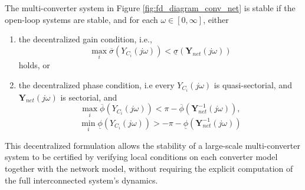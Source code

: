 \begin{thm}
    The multi-converter system in Figure \ref{fig:fd_diagram_conv_net} is stable if the open-loop systems are stable, and for each $\omega \in [0,\infty]$, either
    \begin{enumerate}
        \item 
        the decentralized gain condition, i.e.,
        \begin{equation*}
            \max_i \overline{\sigma}(Y_{C_i}(j\omega))<\underline{\sigma}(\mathbf{Y}_{net}(j\omega))
        \end{equation*}
        holds, or
        \item 
        the decentralized phase condition, i.e
        every $Y_{C_i}(j\omega)$ is quasi-sectorial, and $\mathbf{Y}_{net}(j\omega)$ is sectorial, and
        \begin{equation*}
            \max_i\overline{\phi}(Y_{C_i}(j\omega))<\pi-\overline{\phi}(\mathbf{Y}_{net}^{-1}(j\omega)),
        \end{equation*}
        \vspace{-1.85em}
        \begin{equation*}
            \min_i\underline{\phi}(Y_{C_i}(j\omega))>-\pi-\underline{\phi}(\mathbf{Y}_{net}^{-1}(j\omega))
        \end{equation*}
        \vspace{-2em}
    \end{enumerate}
    \label{thm:dec_mixed_small_gain_phase}
\end{thm}
This decentralized formulation allows the stability of a large-scale multi-converter system to be certified by verifying local conditions on each converter model together with the network model, without requiring the explicit computation of the full interconnected system’s dynamics.